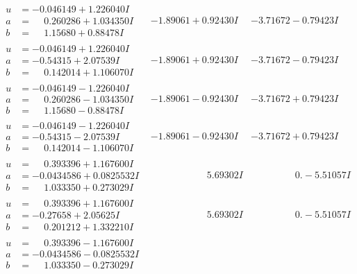 \documentclass[1p]{elsarticle_modified}
\theoremstyle{definition}
\begin{document}
$$\begin{array}{c|c|c}
\begin{aligned}
u &= -0.046149 + 1.226040 I \\
a &= \phantom{-}0.260286 + 1.034350 I \\
b &= \phantom{-}1.15680 + 0.88478 I\end{aligned}
 & -1.89061 + 0.92430 I & -3.71672 - 0.79423 I \\ \hline\begin{aligned}
u &= -0.046149 + 1.226040 I \\
a &= -0.54315 + 2.07539 I \\
b &= \phantom{-}0.142014 + 1.106070 I\end{aligned}
 & -1.89061 + 0.92430 I & -3.71672 - 0.79423 I \\ \hline\begin{aligned}
u &= -0.046149 - 1.226040 I \\
a &= \phantom{-}0.260286 - 1.034350 I \\
b &= \phantom{-}1.15680 - 0.88478 I\end{aligned}
 & -1.89061 - 0.92430 I & -3.71672 + 0.79423 I \\ \hline\begin{aligned}
u &= -0.046149 - 1.226040 I \\
a &= -0.54315 - 2.07539 I \\
b &= \phantom{-}0.142014 - 1.106070 I\end{aligned}
 & -1.89061 - 0.92430 I & -3.71672 + 0.79423 I \\ \hline\begin{aligned}
u &= \phantom{-}0.393396 + 1.167600 I \\
a &= -0.0434586 + 0.0825532 I \\
b &= \phantom{-}1.033350 + 0.273029 I\end{aligned}
 & \phantom{-0.000000 -}5.69302 I & \phantom{-0.000000 } 0. - 5.51057 I \\ \hline\begin{aligned}
u &= \phantom{-}0.393396 + 1.167600 I \\
a &= -0.27658 + 2.05625 I \\
b &= \phantom{-}0.201212 + 1.332210 I\end{aligned}
 & \phantom{-0.000000 -}5.69302 I & \phantom{-0.000000 } 0. - 5.51057 I \\ \hline\begin{aligned}
u &= \phantom{-}0.393396 - 1.167600 I \\
a &= -0.0434586 - 0.0825532 I \\
b &= \phantom{-}1.033350 - 0.273029 I\end{aligned}

\end{array}$$
\end{document}
